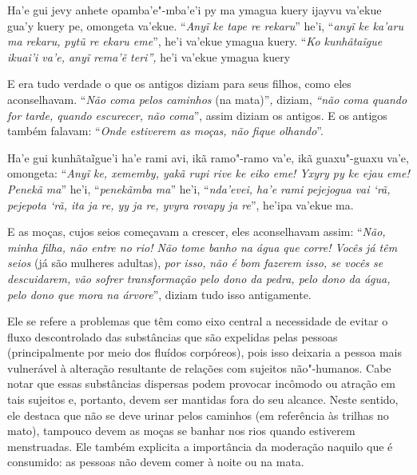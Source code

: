 \begin{paracol}{2}
\vspace{2pt plus 1pt minus 1pt}

\switchcolumn
\medskip
\noindent
Ha'e gui jevy anhete opamba'e"-mba'e'i py ma ymagua kuery ijayvu va'ekue
gua'y kuery pe, omongeta va'ekue. ``\emph{Anyĩ ke tape re rekaru}''
he'i, ``\emph{anyĩ ke ka'aru ma rekaru, pytũ re ekaru eme}'', he'i
va'ekue ymagua kuery. ``\emph{Ko kunhãtaĩgue ikuai'i va'e, anyĩ rema'ẽ
teri'',} he'i va'ekue ymagua kuery

\bigskip

\switchcolumn
\noindent
E era tudo verdade o que os antigos diziam para seus filhos, como eles
aconselhavam. ``\emph{Não coma pelos caminhos} (na mata)''\emph{,}
diziam, \emph{``não coma quando for tarde, quando escurecer, não
coma}'', assim diziam os antigos. E os antigos também falavam:
``\emph{Onde estiverem as moças, não fique olhando}''.

\vspace{2pt plus 1pt minus 1pt}

\switchcolumn
\medskip
\noindent
Ha'e gui kunhãtaĩgue'i ha'e rami avi, ikã ramo"-ramo va'e, ikã
guaxu"-guaxu va'e, omongeta: ``\emph{Anyĩ ke, xememby, yakã rupi rive ke
eiko eme! Yxyry py ke ejau eme! Penekã ma}'' he'i, ``\emph{penekãmba
ma}'' he'i, ``\emph{nda'evei, ha'e rami pejejogua vai `rã, pejepota `rã,
ita ja re, yy ja re, yvyra rovapy ja re}'', he'ipa va'ekue ma.

\bigskip

\switchcolumn
\begin{absolutelynopagebreak}
\noindent
E as moças, cujos seios começavam a crescer, eles aconselhavam assim:
``\emph{Não, minha filha, não entre no rio! Não tome banho na água que
corre! Vocês já têm seios} (já são mulheres adultas), \emph{por isso,}
\emph{não é bom fazerem isso, se vocês se descuidarem, vão sofrer
transformação pelo dono da pedra, pelo dono da água, pelo dono que mora
na árvore}'', diziam tudo isso antigamente.\\
\end{absolutelynopagebreak}
\end{paracol}

\bigskip

Ele se refere a problemas que têm como eixo central a necessidade de
evitar o fluxo descontrolado das substâncias que são expelidas pelas
pessoas (principalmente por meio dos fluídos corpóreos), pois isso
deixaria a pessoa mais vulnerável à alteração resultante de relações
com sujeitos não"-humanos. Cabe notar que essas substâncias dispersas
podem provocar incômodo ou atração em tais sujeitos e, portanto, devem
ser mantidas fora do seu alcance. Neste sentido, ele destaca que não se
deve urinar pelos caminhos (em referência às trilhas no mato), tampouco
devem as moças se banhar nos rios quando estiverem menstruadas. Ele
também explicita a importância da moderação naquilo que é consumido: as
pessoas não devem comer à noite ou na mata. 

